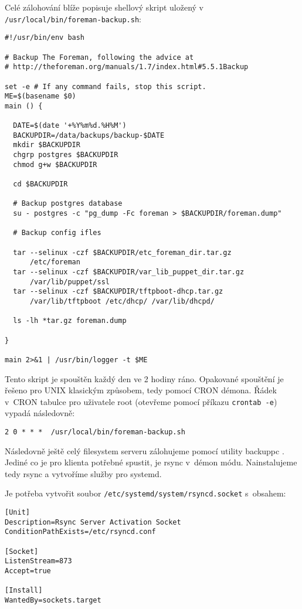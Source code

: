 Celé zálohování blíže popisuje shellový skript uložený v~\\\texttt{/usr/local/bin/foreman-backup.sh}:
\begin{verbatim}
#!/usr/bin/env bash

# Backup The Foreman, following the advice at
# http://theforeman.org/manuals/1.7/index.html#5.5.1Backup

set -e # If any command fails, stop this script.
ME=$(basename $0)
main () {

  DATE=$(date '+%Y%m%d.%H%M')
  BACKUPDIR=/data/backups/backup-$DATE
  mkdir $BACKUPDIR
  chgrp postgres $BACKUPDIR
  chmod g+w $BACKUPDIR

  cd $BACKUPDIR

  # Backup postgres database
  su - postgres -c "pg_dump -Fc foreman > $BACKUPDIR/foreman.dump"

  # Backup config ifles

  tar --selinux -czf $BACKUPDIR/etc_foreman_dir.tar.gz
      /etc/foreman
  tar --selinux -czf $BACKUPDIR/var_lib_puppet_dir.tar.gz
      /var/lib/puppet/ssl
  tar --selinux -czf $BACKUPDIR/tftpboot-dhcp.tar.gz
      /var/lib/tftpboot /etc/dhcp/ /var/lib/dhcpd/

  ls -lh *tar.gz foreman.dump

}

main 2>&1 | /usr/bin/logger -t $ME
\end{verbatim}

Tento skript je spouštěn každý den ve 2 hodiny ráno. Opakované spouštění je řešeno pro UNIX klasickým způsobem, tedy pomocí CRON démona. Řádek v~CRON tabulce pro uživatele root (otevřeme pomocí příkazu \texttt{crontab -e}) vypadá následovně:

\begin{verbatim}
2 0 * * *  /usr/local/bin/foreman-backup.sh
\end{verbatim}



Následovně ještě celý filesystem serveru zálohujeme pomocí utility backuppc \cite{backuppc}. Jediné co je pro klienta potřebné spustit, je rsync v~démon módu. Nainstalujeme tedy rsync a vytvoříme služby pro systemd.

Je potřeba vytvořit soubor  \texttt{/etc/systemd/system/rsyncd.socket} s~obsahem:
\begin{verbatim}
[Unit]
Description=Rsync Server Activation Socket
ConditionPathExists=/etc/rsyncd.conf

[Socket]
ListenStream=873
Accept=true

[Install]
WantedBy=sockets.target
\end{verbatim}

